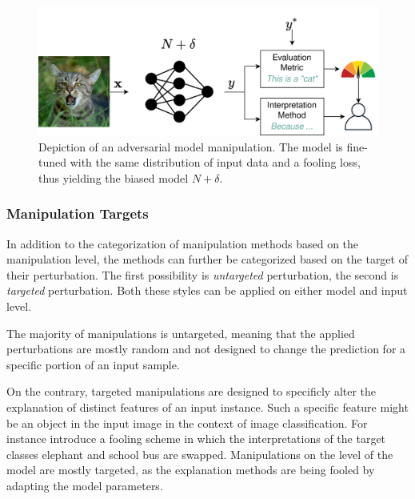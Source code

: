 \begin{figure}[ht]
    \centering
    \includegraphics[width=\linewidth]{figures/model_manipulations.png}
    \caption{Depiction of an adversarial model manipulation. The model is fine-tuned with the same distribution of input data and a fooling loss, thus yielding the biased model $N+\delta$.}
    \label{fig:input_manipulation}
    \vspace{-0.3cm}
\end{figure}

\subsubsection{Manipulation Targets}
\label{subsubsec:manipulation_targets}

\par\smallskip
\noindent
In addition to the categorization of manipulation methods based on the manipulation level, the methods can further be categorized based on the target of their perturbation. The first possibility is \textit{untargeted} perturbation, the second is \textit{targeted} perturbation. Both these styles can be applied on either model and input level. 

The majority of manipulations is untargeted, meaning that the applied perturbations are mostly random and not designed to change the prediction for a specific portion of an input sample. 

On the contrary, targeted manipulations are designed to specificly alter the explanation of distinct features of an input instance. Such a specific feature might be an object in the input image in the context of image classification. 
For instance \cite{fooling_nn_interpreters} introduce a fooling scheme in which the interpretations of the target classes elephant and school bus are swapped. 
Manipulations on the level of the model are mostly targeted, as the explanation methods are being fooled by adapting the model parameters. 


